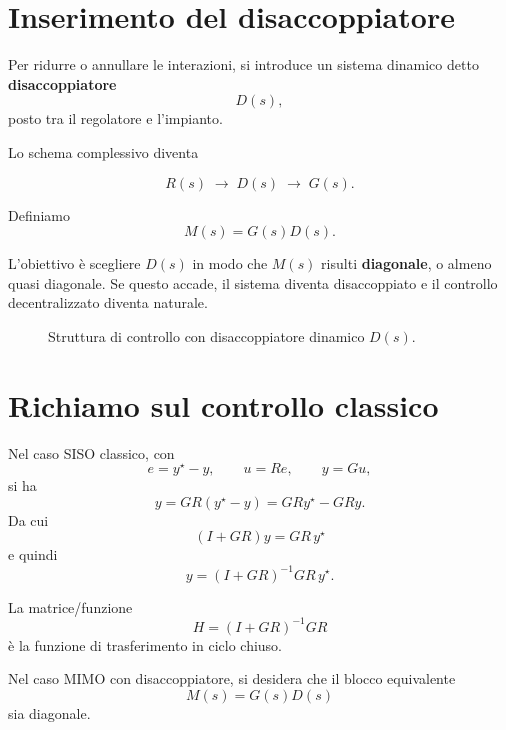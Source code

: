 \section{Inserimento del disaccoppiatore}

Per ridurre o annullare le interazioni, si introduce un sistema dinamico detto \textbf{disaccoppiatore}
\[
D(s),
\]
posto tra il regolatore e l'impianto.

Lo schema complessivo diventa

\[
R(s)\;\longrightarrow\; D(s)\;\longrightarrow\; G(s).
\]

Definiamo
\[
M(s)=G(s)D(s).
\]

L'obiettivo è scegliere \(D(s)\) in modo che \(M(s)\) risulti \textbf{diagonale}, o almeno quasi diagonale. Se questo accade, il sistema diventa disaccoppiato e il controllo decentralizzato diventa naturale.

\begin{figure}[h!]
\centering
{}
\caption{Struttura di controllo con disaccoppiatore dinamico \(D(s)\).}
\end{figure}

\section{Richiamo sul controllo classico}

Nel caso SISO classico, con
\[
e=y^\star-y,\qquad u=Re,\qquad y=Gu,
\]
si ha
\[
y=GR(y^\star-y)=GRy^\star-GRy.
\]
Da cui
\[
(I+GR)y=GR\,y^\star
\]
e quindi
\[
y=(I+GR)^{-1}GR\,y^\star.
\]

La matrice/funzione
\[
H=(I+GR)^{-1}GR
\]
è la funzione di trasferimento in ciclo chiuso.

Nel caso MIMO con disaccoppiatore, si desidera che il blocco equivalente
\[
M(s)=G(s)D(s)
\]
sia diagonale.


